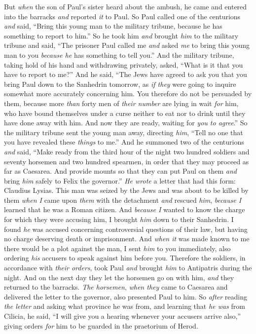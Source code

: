 \begin{biblechapter}
\verse But \textit{when} the son of Paul’s sister heard about the ambush, he came and entered into the barracks \textit{and} reported \textit{it} to Paul.
\verse So Paul called one of the centurions \textit{and} said, “Bring this young man to the military tribune, because he has something to report to him.”
\verse So he took him \textit{and} brought \textit{him} to the military tribune and said, “The prisoner Paul called me \textit{and} asked \textit{me} to bring this young man to you \textit{because he} has something to tell you.”
\verse And the military tribune, taking hold of his hand and withdrawing privately, asked, “What is it that you have to report to me?”
\verse And he said, “The Jews have agreed to ask you that you bring Paul down to the Sanhedrin tomorrow, as \textit{if they} were going to inquire somewhat more accurately concerning him.
\verse You therefore do not be persuaded by them, because more \textit{than} forty men of \textit{their number} are lying in wait \textit{for} him, who have bound themselves under a curse neither to eat nor to drink until they have done away with him. And now they are ready, waiting for \textit{you to agree}.”
\verse So the military tribune sent the young man away, directing \textit{him}, “Tell no one that you have revealed these \textit{things} to me.”
\verse And he summoned two of the centurions \textit{and} said, “Make ready from the third hour of the night two hundred soldiers and seventy horsemen and two hundred spearmen, in order that they may proceed as far as Caesarea.
\verse And provide mounts so that they can put Paul on them \textit{and} bring \textit{him} safely to Felix the governor.”
\verse \textit{He wrote} a letter that had this form:
\verse Claudius Lysias.
\verse This man was seized by the Jews and was about to be killed by them \textit{when I} came upon \textit{them} with the detachment \textit{and} rescued \textit{him}, \textit{because I} learned that he was a Roman citizen.
\verse And \textit{because I} wanted to know the charge for which they were accusing him, I brought \textit{him} down to their Sanhedrin.
\verse I found \textit{he} was accused concerning controversial questions of their law, but having no charge deserving death or imprisonment.
\verse And \textit{when it} was made known to me there would be a plot against the man, I sent \textit{him} to you immediately, also ordering \textit{his} accusers to speak against him before you.
\verse Therefore the soldiers, in accordance with \textit{their orders}, took Paul \textit{and} brought \textit{him} to Antipatris during the night.
\verse And on the next day they let the horsemen go on with him, \textit{and} they returned to the barracks.
\verse \textit{The horsemen}, \textit{when they} came to Caesarea and delivered the letter to the governor, also presented Paul to him.
\verse So \textit{after} reading \textit{the letter} and asking what province he was from, and learning that \textit{he was} from Cilicia,
\verse he said, “I will give you a hearing whenever your accusers arrive also,” giving orders \textit{for} him to be guarded in the praetorium of Herod.
\end{biblechapter}

